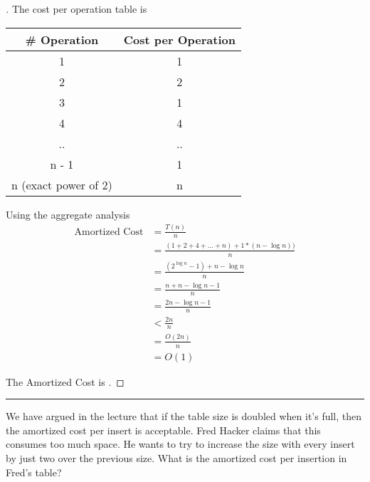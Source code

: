 \documentclass[a4paper, 12pt]{article}
\begin{document}
\begin{proof}[\color{red}{Solution}]
The cost per operation table is
\begin{center}
\begin{tabular}{ |c|c| } 
 \hline
 \textbf{\# Operation} & \textbf{Cost per Operation} \\
 \hline
 1 & 1 \\ 
 \hline
 2 & 2 \\ 
 \hline
 3 & 1 \\ 
 \hline
 4 & 4 \\ 
 \hline
 .. & .. \\ 
 \hline
 n - 1 & 1 \\ 
 \hline
 n (exact power of 2) & n \\ 
 \hline
\end{tabular}
\end{center}
\smallskip
Using the aggregate analysis 
\begin{align*} 
    \text{Amortized Cost} &= \frac{T(n)}{n} \\
    &= \frac{(1 + 2 + 4 + ... + n) + 1*(n-\log n))}{n} \\
    &= \frac{(2^{\log n} - 1) + n - \log n}{n} \tag*{\footnotesize  (Using Geometric Series Summation)} \\
    &= \frac{n + n - \log n - 1}{n} \\
    &= \frac{2n - \log n - 1}{n} \\
    &< \frac{2n}{n} \\
    &= \frac{O(2n)}{n} \\
    &= O(1)
\end{align*}

The Amortized Cost is .


\end{proof}
\bigskip


\hrule
\bigskip
\begin{question}[6]
We have argued in the lecture that if the table size is doubled when it’s full, then the
amortized cost per insert is acceptable. Fred Hacker claims that this consumes too much space.
He wants to try to increase the size with every insert by just two over the previous size. What is
the amortized cost per insertion in Fred’s table?
\end{question}
\end{document}

